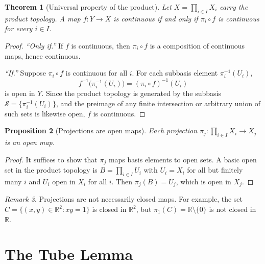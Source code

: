 \documentclass[11pt,a4paper,twoside]{book}
\newtheorem{theorem}{Theorem}[section]
\newtheorem{proposition}[theorem]{Proposition}
\theoremstyle{remark}
\newtheorem{remark}[theorem]{Remark}
\theoremstyle{definition}
\theoremstyle{definition}
\begin{document}
\begin{theorem}[Universal property of the product]
\label{thm:product-universal}
Let $X=\prod_{i\in I}X_i$ carry the product topology.  A map
$f\colon Y\to X$ is continuous if and only if $\pi_i\circ f$ is
continuous for every $i\in I$.
\end{theorem}

\begin{proof}
\emph{``Only if.''}\; If $f$ is continuous, then $\pi_i\circ f$ is
a composition of continuous maps, hence continuous.

\emph{``If.''}\; Suppose $\pi_i\circ f$ is continuous for all $i$.
For each subbasis element $\pi_i^{-1}(U_i)$,
\[
   f^{-1}\bigl(\pi_i^{-1}(U_i)\bigr) = (\pi_i\circ f)^{-1}(U_i)
\]
is open in $Y$.  Since the product topology is generated by the
subbasis $\mathcal{S}=\{\pi_i^{-1}(U_i)\}$, and the preimage of
any finite intersection or arbitrary union of such sets is likewise
open, $f$ is continuous.
\end{proof}

\begin{proposition}[Projections are open maps]
\label{prop:projections-open}
Each projection $\pi_j\colon\prod_{i\in I}X_i\to X_j$ is an open map.
\end{proposition}

\begin{proof}
It suffices to show that $\pi_j$ maps basis elements to open sets.
A basic open set in the product topology is
$B=\prod_{i\in I}U_i$ with $U_i=X_i$ for all but finitely many $i$
and $U_i$ open in $X_i$ for all $i$.  Then
$\pi_j(B)=U_j$, which is open in $X_j$.
\end{proof}

\begin{remark}\label{rem:projections-not-closed}
Projections are not necessarily closed maps.  For example, the set
$C=\{(x,y)\in\mathbb{R}^2 : xy=1\}$ is closed in $\mathbb{R}^2$,
but $\pi_1(C)=\mathbb{R}\setminus\{0\}$ is not closed
in $\mathbb{R}$.
\end{remark}

\section{The Tube Lemma}\label{sec:tube-lemma}
\end{document}
